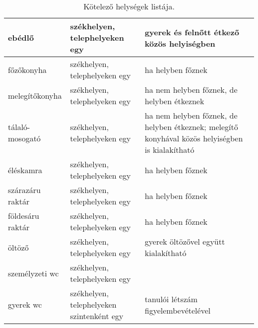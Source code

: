 \begin{table}[thb]
\begin{center}
\begin{tabular}{@{}p{4cm}|p{4cm}|p{6cm}@{}}
ebédlő                 & székhelyen, telephelyeken egy             & gyerek és felnőtt étkező közös helyiségben                                                      \\ \hline
főzőkonyha             & székhelyen, telephelyeken egy             & ha helyben főznek                                                                               \\ \hline
melegítőkonyha         & székhelyen, telephelyeken egy             & ha nem helyben főznek, de helyben étkeznek                                                      \\ \hline
tálaló-mosogató        & székhelyen, telephelyeken egy             & ha nem helyben főznek, de helyben étkeznek; melegítő konyhával közös helyiségben is kialakítható \\ \hline
éléskamra              & székhelyen, telephelyeken egy             & ha helyben főznek                                                                               \\ \hline
szárazáru raktár       & székhelyen, telephelyeken egy             & ha helyben főznek                                                                               \\ \hline
földesáru raktár       & székhelyen, telephelyeken egy             & ha helyben főznek                                                                               \\ \hline
öltöző                 & székhelyen, telephelyeken egy             & gyerek öltözővel együtt kialakítható                                                            \\ \hline
személyzeti wc         & székhelyen, telephelyeken egy             &                                                                                                 \\ \hline
gyerek wc              & székhelyen, telephelyeken szintenként egy & tanulói létszám figyelembevételével                                                            \\
\end{tabular}
\caption{Kötelező helységek listája.}
\label{tbl:helyisegek}
\end{center}
\end{table}
